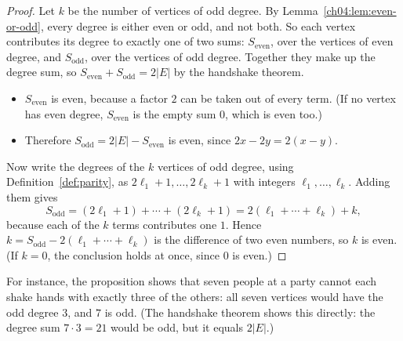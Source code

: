 \begin{proof}
Let $k$ be the number of vertices of odd degree. By Lemma~\ref{ch04:lem:even-or-odd}, every degree is either even or odd, and not both. So each vertex contributes its degree to exactly one of two sums: $S_{\mathrm{even}}$, over the vertices of even degree, and $S_{\mathrm{odd}}$, over the vertices of odd degree. Together they make up the degree sum, so $S_{\mathrm{even}}+S_{\mathrm{odd}}=2|E|$ by the handshake theorem.
\begin{itemize}
\item $S_{\mathrm{even}}$ is even, because a factor $2$ can be taken out of every term. (If no vertex has even degree, $S_{\mathrm{even}}$ is the empty sum $0$, which is even too.)
\item Therefore $S_{\mathrm{odd}}=2|E|-S_{\mathrm{even}}$ is even, since $2x-2y=2(x-y)$.
\end{itemize}
Now write the degrees of the $k$ vertices of odd degree, using Definition~\ref{def:parity}, as $2\ell_1+1,\ldots,2\ell_k+1$ with integers $\ell_1,\ldots,\ell_k$. Adding them gives
\[
S_{\mathrm{odd}}=(2\ell_1+1)+\cdots+(2\ell_k+1)=2(\ell_1+\cdots+\ell_k)+k,
\]
because each of the $k$ terms contributes one $1$. Hence $k=S_{\mathrm{odd}}-2(\ell_1+\cdots+\ell_k)$ is the difference of two even numbers, so $k$ is even. (If $k=0$, the conclusion holds at once, since $0$ is even.)
\end{proof}

For instance, the proposition shows that seven people at a party cannot each shake hands with exactly three of the others: all seven vertices would have the odd degree $3$, and $7$ is odd. (The handshake theorem shows this directly: the degree sum $7\cdot3=21$ would be odd, but it equals $2|E|$.)
